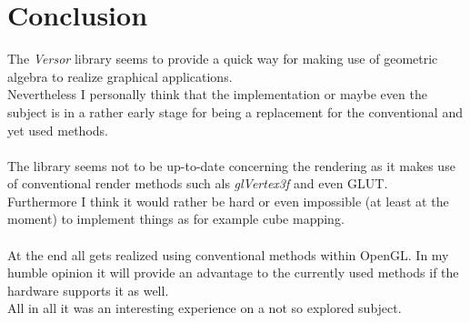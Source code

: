 \documentclass[pdftex,12pt,a4paper]{article}
\begin{document}
\section{Conclusion}
The \textit{Versor} library seems to provide a quick way for making use of geometric algebra to realize graphical applications.\\
Nevertheless I personally think that the implementation or maybe even the subject is in a rather early stage for being a replacement for the conventional and yet used methods.\\
\\
The library seems not to be up-to-date concerning the rendering as it makes use of conventional render methods such als \textit{glVertex3f} and even \gls{GLUT}.\\
Furthermore I think it would rather be hard or even impossible (at least at the moment) to implement things as for example \gls{cube mapping}.\\
\\
At the end all gets realized using conventional methods within OpenGL. In my humble opinion it will provide an advantage to the currently used methods if the hardware supports it as well.\\
All in all it was an interesting experience on a not so explored subject.

\printglossary[numberedsection]
\end{document}

